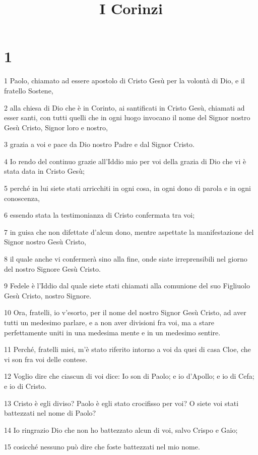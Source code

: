 

\title{I Corinzi}


\chapter{1}

\par 1 Paolo, chiamato ad essere apostolo di Cristo Gesù per la volontà di Dio, e il fratello Sostene,
\par 2 alla chiesa di Dio che è in Corinto, ai santificati in Cristo Gesù, chiamati ad esser santi, con tutti quelli che in ogni luogo invocano il nome del Signor nostro Gesù Cristo, Signor loro e nostro,
\par 3 grazia a voi e pace da Dio nostro Padre e dal Signor Cristo.
\par 4 Io rendo del continuo grazie all'Iddio mio per voi della grazia di Dio che vi è stata data in Cristo Gesù;
\par 5 perché in lui siete stati arricchiti in ogni cosa, in ogni dono di parola e in ogni conoscenza,
\par 6 essendo stata la testimonianza di Cristo confermata tra voi;
\par 7 in guisa che non difettate d'alcun dono, mentre aspettate la manifestazione del Signor nostro Gesù Cristo,
\par 8 il quale anche vi confermerà sino alla fine, onde siate irreprensibili nel giorno del nostro Signore Gesù Cristo.
\par 9 Fedele è l'Iddio dal quale siete stati chiamati alla comunione del suo Figliuolo Gesù Cristo, nostro Signore.
\par 10 Ora, fratelli, io v'esorto, per il nome del nostro Signor Gesù Cristo, ad aver tutti un medesimo parlare, e a non aver divisioni fra voi, ma a stare perfettamente uniti in una medesima mente e in un medesimo sentire.
\par 11 Perché, fratelli miei, m'è stato riferito intorno a voi da quei di casa Cloe, che vi son fra voi delle contese.
\par 12 Voglio dire che ciascun di voi dice: Io son di Paolo; e io d'Apollo; e io di Cefa; e io di Cristo.
\par 13 Cristo è egli diviso? Paolo è egli stato crocifisso per voi? O siete voi stati battezzati nel nome di Paolo?
\par 14 Io ringrazio Dio che non ho battezzato alcun di voi, salvo Crispo e Gaio;
\par 15 cosicché nessuno può dire che foste battezzati nel mio nome.
